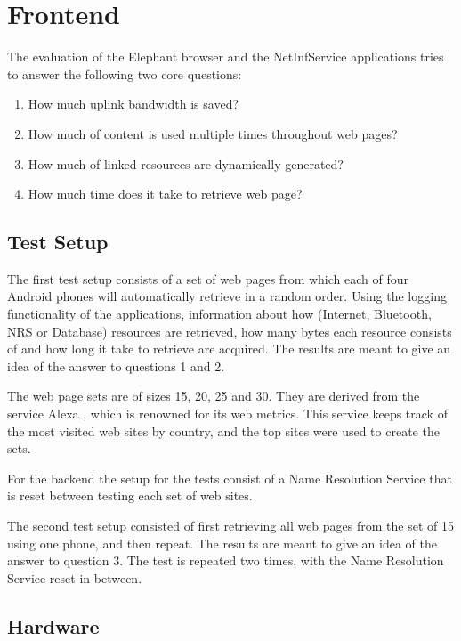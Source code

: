 \section{Frontend}

The evaluation of the Elephant browser and the NetInfService applications tries to answer the following two core questions:

\begin{enumerate}
\item How much uplink bandwidth is saved?
\item How much of content is used multiple times throughout web pages?
\item How much of linked resources are dynamically generated?
\item How much time does it take to retrieve web page?
\end{enumerate}

\subsection{Test Setup}

The first test setup consists of a set of web pages from which each of four Android phones will automatically retrieve in a random order. Using the logging functionality of the applications, information about how (Internet, Bluetooth, NRS or Database) resources are retrieved, how many bytes each resource consists of and how long it take to retrieve are acquired. The results are meant to give an idea of the answer to questions 1 and 2.

The web page sets are of sizes 15, 20, 25 and 30. They are derived from the service Alexa \cite{alexa}, which is renowned for its web metrics. This service keeps track of the most visited web sites by country, and the top sites were used to create the sets.

For the backend the setup for the tests consist of a Name Resolution Service that is reset between testing each set of web sites.

The second test setup consisted of first retrieving all web pages from the set of 15 using one phone, and then repeat. The results are meant to give an idea of the answer to question 3. The test is repeated two times, with the Name Resolution Service reset in between. 

\subsection{Hardware}

